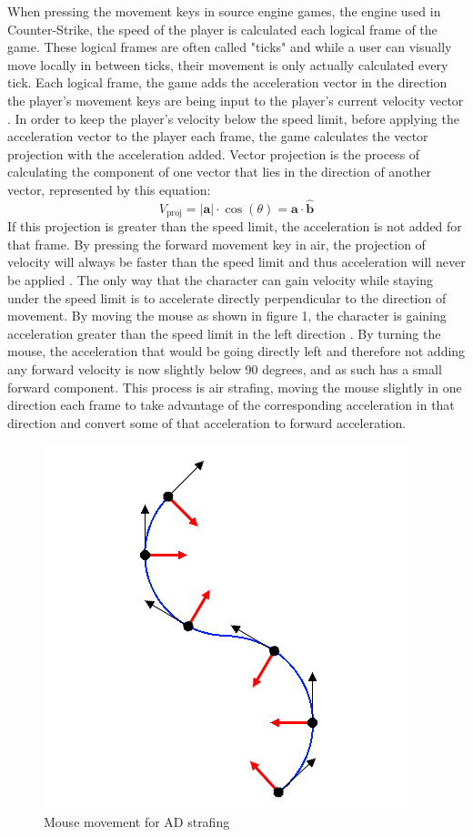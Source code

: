 \documentclass[10pt,twocolumn]{article}
\begin{document}
When pressing the movement keys in source engine games, the engine used in Counter-Strike, the speed of the player is calculated each logical frame of the game. These logical frames are often called "ticks" and while a user can visually move locally in between ticks, their movement is only actually calculated every tick. Each logical frame, the game adds the acceleration vector in the direction the player's movement keys are being input to the player's current velocity vector \cite{BunnyHoppingProgrammers}. In order to keep the player's velocity below the speed limit, before applying the acceleration vector to the player each frame, the game calculates the vector projection with the acceleration added. Vector projection is the process of calculating the component of one vector that lies in the direction of another vector, represented by this equation: \[ V_{\text{proj}} = |\mathbf{a}| \cdot \cos(\theta) = \mathbf{a} \cdot \hat{\mathbf{b}} \] If this projection is greater than the speed limit, the acceleration is not added for that frame. By pressing the forward movement key in air, the projection of velocity will always be faster than the speed limit and thus acceleration will never be applied \cite{MoreSteamAirstrafe}. The only way that the character can gain velocity while staying under the speed limit is to accelerate directly perpendicular to the direction of movement. By moving the mouse as shown in figure 1, the character is gaining acceleration greater than the speed limit in the left direction \cite{MoreSteamAirstrafe}. By turning the mouse, the acceleration that would be going directly left and therefore not adding any forward velocity is now slightly below 90 degrees, and as such has a small forward component. This process is air strafing, moving the mouse slightly in one direction each frame to take advantage of the corresponding acceleration in that direction and convert some of that acceleration to forward acceleration.

\begin{figure}
    \centering
    \includegraphics[width=0.5\linewidth]{figure1.png}
    \caption{Mouse movement for AD strafing \cite{MoreSteamAirstrafe}}
\end{figure}
\end{document}
